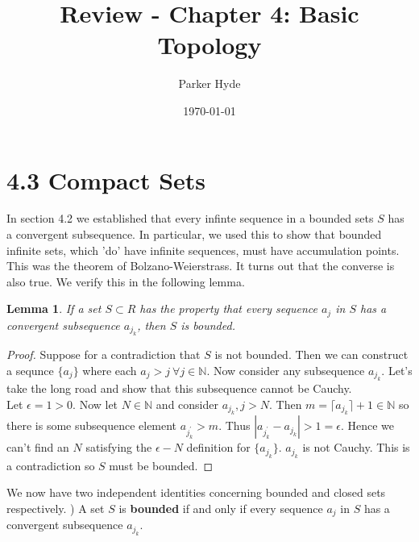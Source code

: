 \documentclass{article}
\begin{document}
\title{Review - Chapter 4: Basic Topology}
\author{Parker Hyde}
\date{\today}
\maketitle

\newtheorem{theorem}{Theorem}
\newtheorem{definition}{Definition}
\newtheorem{exmp}{Example}
\newtheorem{proposition}{Proposition}
\newtheorem{lemma}{Lemma}
\newtheorem{corollary}{Corollary}
\newtheorem{remark}{Remark}

\section*{4.3 Compact Sets}

In section 4.2 we established that every infinte sequence in a bounded sets \( S \) has
a convergent subsequence. In particular, we used this to show that bounded infinite sets,
which 'do' have infinite sequences, must have accumulation points. This was the theorem
of Bolzano-Weierstrass.
\smallbreak
It turns out that the converse is also true. We verify this in the following lemma. 

\begin{lemma}
    If a set \( S \subset R \) has the property that every sequence \( a_j \) in \( S \) 
    has a convergent subsequence \( a_{j_k} \), then \( S \) is bounded.
\end{lemma}
\begin{proof}
    Suppose for a contradiction that \( S \) is not bounded. Then we can construct
    a sequnce \( \{a_j\} \) where each \( a_j > j  \ \forall j \in \mathbb{N} \). Now
    consider any subsequence \( a_{j_k} \). Let's take the long road and show that this 
    subsequence cannot be Cauchy. \\
    Let \( \epsilon = 1 > 0 \). Now let \(N \in \mathbb{N}\) and consider \( a_{j_k}, j > N \).
    Then \( m = \lceil a_{j_k} \rceil + 1 \in \mathbb{N}\) so there is some
    subsequence element \( a_{j_k^\prime} > m\). Thus \( | a_{j_k^\prime} - a_{j_k} | > 1 = \epsilon \).
    Hence we can't find an  \( N \) satisfying the \( \epsilon - N \) definition for \( \{a_{j_k}\} \). 
    \( a_{j_k} \) is not Cauchy. \smallbreak
    This is a contradiction so \( S \) must be bounded.
\end{proof}
We now have two independent identities concerning bounded and closed sets respectively.
) A set \( S \) is \textbf{bounded} if and only if every sequence \( a_j \) in \( S \) has a convergent
subsequence \( a_{j_k} \).
\end{document}
